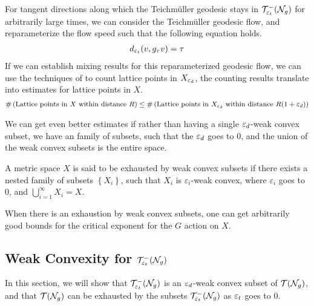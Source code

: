 For tangent directions along which the Teichmüller geodesic stays in $\mathcal{T}_{\varepsilon_t}^{-}(\mathcal{N}_g)$ for arbitrarily large times, we can consider the Teichmüller geodesic flow, and reparameterize the flow speed such that the following equation holds.
\begin{align*}
  d_{\varepsilon_t}(v, g_{\tau} v) = \tau
\end{align*}
If we can establish mixing results for this reparameterized geodesic flow, we can use the techniques of \textcite{roblin2003ergodicite} to count lattice points in $X_{\varepsilon_d}$, the counting results translate into estimates for lattice points in $X$.
\begin{align*}
  \#\left( \text{Lattice points in $X$ within distance $R$} \right) \leq \#\left( \text{Lattice points in $X_{\varepsilon_d}$ within distance $R(1 + \varepsilon_d)$} \right)
\end{align*}

We can get even better estimates if rather than having a single $\varepsilon_d$-weak convex subset, we have an family of subsets, such that the $\varepsilon_d$ goes to $0$, and the union of the weak convex subsets is the entire space.

\begin{definition}
  A metric space $X$ is said to be exhausted by weak convex subsets if there exists a nested family of subsets $\left\{ X_i \right\}$, such that $X_i$ is $\varepsilon_i$-weak convex, where $\varepsilon_i$ goes to $0$, and $\bigcup_{i=1}^{\infty} X_i = X$.
\end{definition}

When there is an exhaustion by weak convex subsets, one can get arbitrarily good bounds for the critical exponent for the $G$ action on $X$.

\subsection{Weak Convexity for $\mathcal{T}_{\varepsilon_t}^{-}(\mathcal{N}_g)$}
\label{sec:weak-conv-syst}

In this section, we will show that $\mathcal{T}_{\varepsilon_t}^{-}(\mathcal{N}_g)$ is an $\varepsilon_d$-weak convex subset of $\mathcal{T}(\mathcal{N}_g)$, and that $\mathcal{T}(\mathcal{N}_g)$ can be exhausted by the subsets $\mathcal{T}_{\varepsilon_t}^{-}(\mathcal{N}_g)$ as $\varepsilon_t$ goes to $0$.

